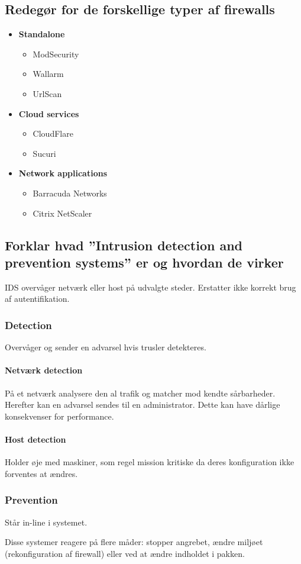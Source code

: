 \subsection{Redegør for de forskellige typer af firewalls}
\begin{itemize}
	\item \textbf{Standalone}
	\begin{itemize}
		\item ModSecurity
		\item Wallarm
		\item UrlScan
	\end{itemize}
	\item \textbf{Cloud services}
	\begin{itemize}
		\item CloudFlare
		\item Sucuri
	\end{itemize}
	\item \textbf{Network applications}
	\begin{itemize}
		\item Barracuda Networks
		\item Citrix NetScaler
	\end{itemize}
\end{itemize}

\subsection{Forklar hvad ”Intrusion detection and prevention systems” er og hvordan de virker}
IDS overvåger netværk eller host på udvalgte steder. Erstatter ikke korrekt brug af autentifikation.

\subsubsection{Detection}
Overvåger og sender en advarsel hvis trusler detekteres.

\paragraph{Netværk detection}
På et netværk analysere den al trafik og matcher mod kendte sårbarheder. Herefter kan en advarsel sendes til en administrator. Dette kan have dårlige konsekvenser for performance.

\paragraph{Host detection}
Holder øje med maskiner, som regel mission kritiske da deres konfiguration ikke forventes at ændres.

\subsubsection{Prevention}
Står in-line i systemet. 

Disse systemer reagere på flere måder: stopper angrebet, ændre miljøet (rekonfiguration af firewall) eller ved at ændre indholdet i pakken.
